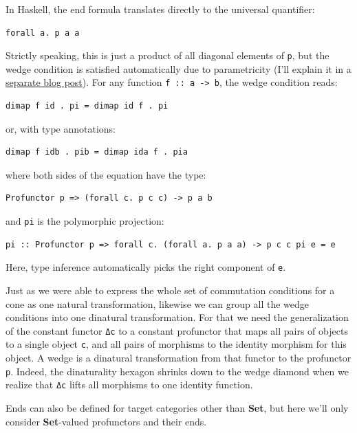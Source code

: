In Haskell, the end formula translates directly to the universal
quantifier:

\begin{verbatim}
forall a. p a a
\end{verbatim}

Strictly speaking, this is just a product of all diagonal elements of
\texttt{p}, but the wedge condition is satisfied automatically due to
parametricity (I'll explain it in a
\href{https://bartoszmilewski.com/2017/04/11/profunctor-parametricity/}{separate
blog post}). For any function \texttt{f\ ::\ a\ -\textgreater{}\ b}, the
wedge condition reads:

\begin{verbatim}
dimap f id . pi = dimap id f . pi
\end{verbatim}

or, with type annotations:

\begin{verbatim}
dimap f idb . pib = dimap ida f . pia
\end{verbatim}

where both sides of the equation have the type:

\begin{verbatim}
Profunctor p => (forall c. p c c) -> p a b
\end{verbatim}

and \texttt{pi} is the polymorphic projection:

\begin{verbatim}
pi :: Profunctor p => forall c. (forall a. p a a) -> p c c pi e = e
\end{verbatim}

Here, type inference automatically picks the right component of
\texttt{e}.

Just as we were able to express the whole set of commutation conditions
for a cone as one natural transformation, likewise we can group all the
wedge conditions into one dinatural transformation. For that we need the
generalization of the constant functor \texttt{Δc} to a constant
profunctor that maps all pairs of objects to a single object \texttt{c},
and all pairs of morphisms to the identity morphism for this object. A
wedge is a dinatural transformation from that functor to the profunctor
\texttt{p}. Indeed, the dinaturality hexagon shrinks down to the wedge
diamond when we realize that \texttt{Δc} lifts all morphisms to one
identity function.

Ends can also be defined for target categories other than \textbf{Set},
but here we'll only consider \textbf{Set}-valued profunctors and their
ends.

